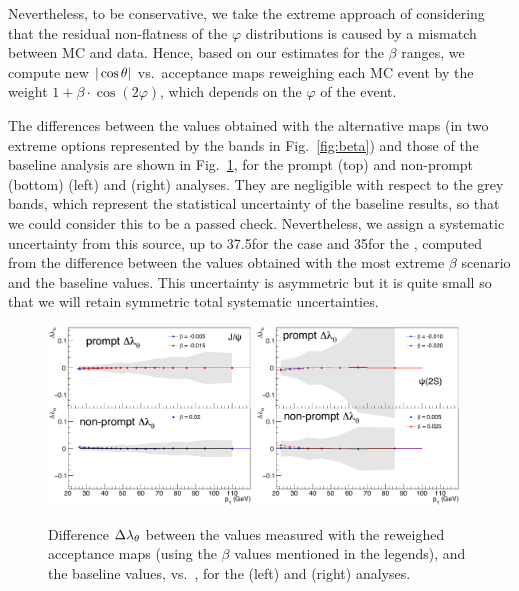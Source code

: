 Nevertheless, to be conservative, 
we take the extreme approach of considering that
the residual non-flatness of the $\varphi$ distributions is caused by a 
mismatch between MC and data.
Hence, based on our estimates for the $\beta$ ranges, we compute new $|\cos\theta|$ vs.\ \pt acceptance maps 
reweighing each MC event by the weight $1 + \beta \cdot \cos(2 \varphi)$,
which depends on the $\varphi$ of the event.

\vfill\newpage

The differences between the \lth values obtained with the alternative maps 
(in two extreme options represented by the bands in Fig.~\ref{fig:beta})
and those of the baseline analysis are shown in Fig.~\ref{fig:lth_absDiff_phi},
for the prompt (top) and non-prompt (bottom) \jpsi (left) and \psip (right) analyses.
They are negligible with respect to the grey bands, 
which represent the statistical uncertainty of the baseline results,
so that we could consider this to be a passed check.
Nevertheless, we assign a systematic uncertainty from this source, 
up to 37.5\GeV for the \jpsi case and 35\GeV for the \psip,
computed from the difference between the \lth values 
obtained with the most extreme $\beta$ scenario 
and the baseline values.
This uncertainty is asymmetric but it is quite small
so that we will retain symmetric total systematic uncertainties.

\begin{figure}[t]
\centering
\includegraphics[width=0.48\textwidth]{Figures/chapter6/lth_absDiff_phi_PR_NP-jpsi.pdf}
\includegraphics[width=0.48\textwidth]{Figures/chapter6/lth_absDiff_phi_PR_NP-psip.pdf}
\caption{Difference $\Delta \lambda_\theta$ between the \lth values measured with 
the reweighed acceptance maps 
(using the $\beta$ values mentioned in the legends),
and the baseline values, vs.\ \pt, for the \jpsi (left) and \psip (right) analyses.}
\label{fig:lth_absDiff_phi}
\end{figure}

